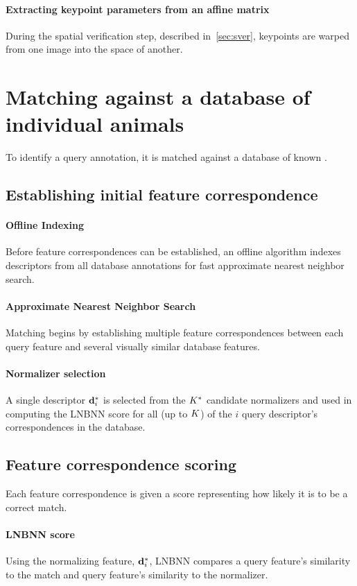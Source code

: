         \paragraph{Extracting keypoint parameters from an affine matrix}
        During the spatial verification step, described in~\cref{sec:sver}, keypoints are warped from one image into
          the space of another.
\section{Matching against a database of individual animals}
    To identify a query annotation, it is matched against a database of known \names{}.
    
    \subsection{Establishing initial feature correspondence}
        \paragraph{Offline Indexing}
        Before feature correspondences can be established, an offline algorithm indexes descriptors from all database
          annotations for fast approximate nearest neighbor search.
        \paragraph{Approximate Nearest Neighbor Search}
        Matching begins by establishing multiple feature correspondences between each query feature and several
          visually similar database features.
        \paragraph{Normalizer selection}
        A single descriptor $\mathbf{d}^{*}_{i}$ is selected from the $K^{*}{}$ candidate normalizers and used in
          computing the LNBNN score for all (up to $K$) of the $i$\th{} query descriptor's correspondences in the
          database.
        
    \subsection{Feature correspondence scoring}
        Each feature correspondence is given a score representing how likely it is to be a correct match.
        
        \paragraph{LNBNN score}
        Using the normalizing feature, $\mathbf{d}^{*}_{i}$, LNBNN compares a query feature's similarity to the match and
          query feature's similarity to the normalizer.
